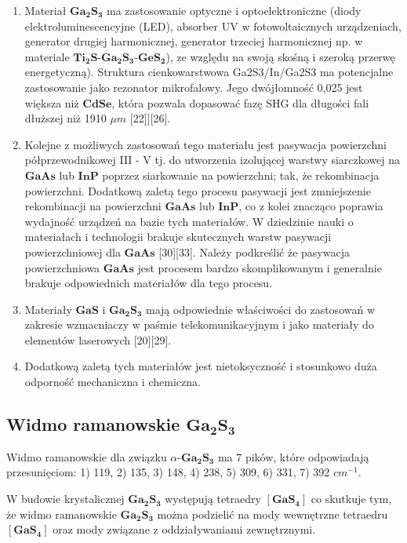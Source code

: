 \begin{enumerate}
	\item Materiał $\mathbf{Ga_{2}S_{3}}$ ma zastosowanie optyczne i optoelektroniczne (diody elektroluminescencyjne (LED), absorber UV w fotowoltaicznych urządzeniach, generator drugiej harmonicznej, generator trzeciej harmonicznej np. w materiale $\mathbf{Ti_{2}S}$-$\mathbf{Ga_{2}S_{3}}$-$\mathbf{GeS_{2}}$), ze względu na swoją skośną i szeroką przerwę energetyczną). Struktura cienkowarstwowa Ga2S3/In/Ga2S3 ma potencjalne zastosowanie jako rezonator mikrofalowy. Jego dwójłomność 0,025 jest większa niż $\mathbf{CdSe}$, która pozwala dopasować fazę SHG dla długości fali dłuższej niż 1910 $\mu m$ [22]][26].
	
	\item Kolejne z możliwych zastosowań tego materiału jest pasywacja powierzchni półprzewodnikowej III - V tj. do utworzenia izolującej warstwy siarczkowej na $\mathbf{GaAs}$ lub $\mathbf{InP}$ poprzez siarkowanie na powierzchni; tak, że rekombinacja powierzchni. Dodatkową zaletą tego procesu pasywacji jest zmniejszenie rekombinacji na powierzchni $\mathbf{GaAs}$ lub $\mathbf{InP}$, co z kolei znacząco poprawia wydajność urządzeń na bazie tych materiałów. W dziedzinie nauki o materiałach i technologii brakuje skutecznych warstw pasywacji powierzchniowej  dla $\mathbf{GaAs}$ [30][33]. Należy podkreślić że pasywacja powierzchniowa $\mathbf{GaAs}$ jest procesem bardzo skomplikowanym i generalnie brakuje odpowiednich materiałów dla tego procesu.
	
	\item Materiały $\mathbf{GaS}$ i $\mathbf{Ga_{2}S_{3}}$ mają odpowiednie właściwości do zastosowań w zakresie wzmacniaczy w paśmie telekomunikacyjnym i jako materiały do elementów laserowych [20][29].
	
	\item Dodatkową zaletą tych materiałów jest nietoksyczność i stosunkowo duża odporność mechaniczna i chemiczna.
\end{enumerate}

\subsection{Widmo ramanowskie $\mathbf{Ga_{2}S_{3}}$}

Widmo ramanowskie dla związku $\alpha$-$\mathbf{Ga_{2}S_{3}}$ ma 7 pików, które odpowiadają przesunięciom: 1) 119, 2) 135, 3) 148, 4) 238, 5) 309, 6) 331, 7) 392 $cm^{-1}$.

W budowie krystalicznej $\mathbf{Ga_{2}S_{3}}$ występują tetraedry $[\mathbf{GaS_{4}}]$ co skutkuje tym, że widmo ramanowskie $\mathbf{Ga_{2}S_{3}}$ można podzielić na mody wewnętrzne tetraedru $[\mathbf{GaS_{4}}]$ oraz mody związane
z oddziaływaniami zewnętrznymi.


